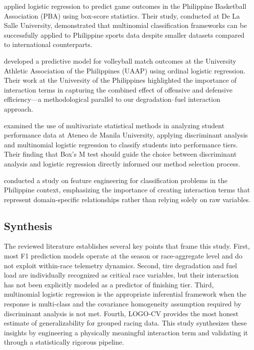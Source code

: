 \textcite{dalisay2022} applied logistic regression to predict game outcomes
in the Philippine Basketball Association (PBA) using box-score statistics.
Their study, conducted at De La Salle University, demonstrated that
multinomial classification frameworks can be successfully applied to
Philippine sports data despite smaller datasets compared to international
counterparts.

\textcite{reyes2021} developed a predictive model for volleyball match
outcomes at the University Athletic Association of the Philippines (UAAP)
using ordinal logistic regression. Their work at the University of the
Philippines highlighted the importance of interaction terms in capturing
the combined effect of offensive and defensive efficiency---a methodological
parallel to our degradation--fuel interaction approach.

\textcite{mendoza2023} examined the use of multivariate statistical methods
in analyzing student performance data at Ateneo de Manila University, applying
discriminant analysis and multinomial logistic regression to classify students
into performance tiers. Their finding that Box's M test should guide the
choice between discriminant analysis and logistic regression directly informed
our method selection process.

\textcite{santos2020} conducted a study on feature engineering for
classification problems in the Philippine context, emphasizing the importance
of creating interaction terms that represent domain-specific relationships
rather than relying solely on raw variables.

\subsection{Synthesis}

The reviewed literature establishes several key points that frame this study.
First, most F1 prediction models operate at the season or race-aggregate
level and do not exploit within-race telemetry dynamics. Second, tire
degradation and fuel load are individually recognized as critical race
variables, but their interaction has not been explicitly modeled as a
predictor of finishing tier. Third, multinomial logistic regression is the
appropriate inferential framework when the response is multi-class and the
covariance homogeneity assumption required by discriminant analysis is not
met. Fourth, LOGO-CV provides the most honest estimate of generalizability
for grouped racing data. This study synthesizes these insights by engineering
a physically meaningful interaction term and validating it through a
statistically rigorous pipeline.

